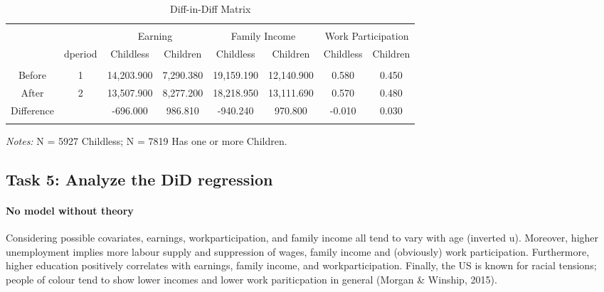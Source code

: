 \documentclass[a4paper]{article}
\begin{document}
\begin{table}[!htbp] 
\begin{adjustwidth}{-0cm}{-0cm}
\begin{threeparttable}
\small
\captionsetup{font=small, justification=raggedright,singlelinecheck=false}
  \caption{Diff-in-Diff Matrix} 
  \label{} 
\begin{tabular}{@{\extracolsep{8pt}}lccccccc} 
\\[-5.8ex]\hline 
\hline \\[-1.8ex]
\multicolumn{2}{c}{}  & \multicolumn{2}{c}{Earning}  & \multicolumn{2}{c}{Family Income} & \multicolumn{2}{c}{Work Participation} \\ 
\multicolumn{1}{c}{} & \multicolumn{1}{c}{dperiod} & \multicolumn{1}{c}{Childless} & \multicolumn{1}{c}{Children} & \multicolumn{1}{c}{Childless} & \multicolumn{1}{c}{Children} & \multicolumn{1}{c}{Childless} & \multicolumn{1}{c}{Children} \\ 
\hline \\[-1.8ex] 
\multicolumn{1}{c}{Before} & 1 & 14,203.900 & 7,290.380 & 19,159.190 & 12,140.900 & 0.580 & 0.450 \\ 
\multicolumn{1}{c}{After} & 2 & 13,507.900 & 8,277.200 & 18,218.950 & 13,111.690 & 0.570 & 0.480 \\ 
\multicolumn{1}{c}{Difference} &  & -696.000 & 986.810 & -940.240 & 970.800 & -0.010 & 0.030 \\ 
\hline \\[-3.6ex] 
\end{tabular} 
\begin{tablenotes}
      \small
      \item\textit{Notes:} N = 5927 Childless; N = 7819 Has one or more Children.
    \end{tablenotes}
\end{threeparttable}
\end{adjustwidth}
\end{table}


\subsection{Task 5: Analyze the DiD regression}




\paragraph{No model without theory} Considering possible covariates, earnings, workparticipation, and family income all tend to vary with age (inverted u). Moreover, higher unemployment implies more labour supply and suppression of wages, family income and (obviously) work participation. Furthermore, higher education positively correlates with earnings, family income, and workparticipation. Finally, the US is known for racial tensions; people of colour tend to show lower incomes and lower work pariticpation in general (Morgan \& Winship, 2015). 
\end{document}
